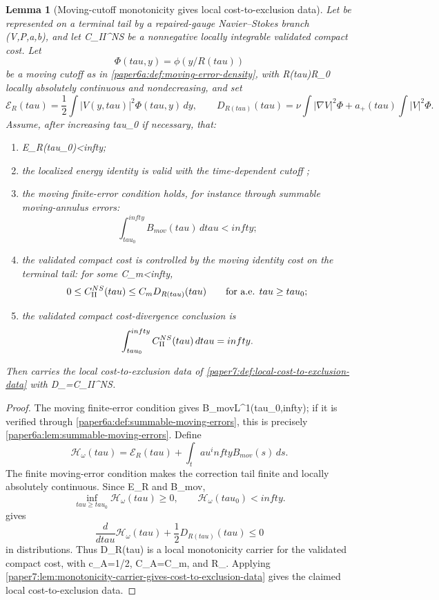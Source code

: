 \documentclass[11pt]{amsart}
\def\({}%
\def\){}%
\def\tilde#1{#1}%
\def\mathfrak#1{#1}%
\def\mathrm#1{#1}%
\def\tau{tau}%
\def\infty{infty}%
\theoremstyle{plain}
\newtheorem{lemma}[lemma]{Lemma}
\theoremstyle{definition}
\theoremstyle{remark}
\begin{document}
\begin{lemma}[Moving-cutoff monotonicity gives local cost-to-exclusion data]
\label{paper7:lem:moving-monotonicity-gives-cost-to-exclusion-data}
Let \(\omega\) be represented on a terminal tail by a repaired-gauge
Navier--Stokes branch \((V,P,a,b)\), and let
\(\mathfrak C_{\rm II}^{NS}\) be a nonnegative locally integrable validated
compact cost.  Let
\[
  \Phi(\tau,y)=\phi(y/R(\tau))
\]
be a moving cutoff as in \cref{paper6a:def:moving-error-density}, with
\(R(\tau)\ge R_0\) locally absolutely continuous and nondecreasing, and set
\[
  \mathcal E_R(\tau)=\frac12\int |V(y,\tau)|^2\Phi(\tau,y)\,dy,
  \qquad
  \tilde{\mathfrak D}_{R(\tau)}(\tau)
  =
  \nu\int|\nabla V|^2\Phi
  +a_+(\tau)\int|V|^2\Phi .
\]
Assume, after increasing \(\tau_0\) if necessary, that:
\begin{enumerate}[label=\textup{(\roman*)}]
\item \(\mathcal E_R(\tau_0)<\infty\);
\item the localized energy identity is valid with the time-dependent cutoff
\(\Phi\);
\item the moving finite-error condition holds, for instance through summable
moving-annulus errors:
\[
  \int_{\tau_0}^{\infty}B_{\mathrm{mov}}(\tau)\,d\tau<\infty;
\]
\item the validated compact cost is controlled by the moving identity cost on
the terminal tail: for some \(C_m<\infty\),
\[
  0\le \mathfrak C_{\rm II}^{NS}(\tau)
  \le C_m\tilde{\mathfrak D}_{R(\tau)}(\tau)
  \qquad\text{for a.e. }\tau\ge\tau_0;
\]
\item the validated compact cost-divergence conclusion is
\[
  \int_{\tau_0}^{\infty}
  \mathfrak C_{\rm II}^{NS}(\tau)\,d\tau=\infty .
\]
\end{enumerate}
Then \(\omega\) carries the local cost-to-exclusion data of
\cref{paper7:def:local-cost-to-exclusion-data} with
\(\mathcal D_\omega=\mathfrak C_{\rm II}^{NS}\).
\end{lemma}

\begin{proof}
The moving finite-error condition gives
\(B_{\mathrm{mov}}\in L^1(\tau_0,\infty)\); if it is verified through
\cref{paper6a:def:summable-moving-errors}, this is precisely
\cref{paper6a:lem:summable-moving-errors}.  Define
\[
  \mathcal H_\omega(\tau)
  =
  \mathcal E_R(\tau)+\int_\tau^\infty B_{\mathrm{mov}}(s)\,ds .
\]
The finite moving-error condition makes the correction tail finite and locally
absolutely continuous.  Since \(\mathcal E_R\) and
\(B_{\mathrm{mov}}\),
\[
  \inf_{\tau\ge\tau_0}\mathcal H_\omega(\tau)\ge0,
  \qquad
  \mathcal H_\omega(\tau_0)<\infty .
\]
 gives
\[
  \frac{d}{d\tau}\mathcal H_\omega(\tau)
  +\frac12\tilde{\mathfrak D}_{R(\tau)}(\tau)\le0
\]
in distributions.  Thus
\(\tilde{\mathfrak D}_{R(\tau)}\) is a local monotonicity carrier for the
validated compact cost, with \(c_A=1/2\), \(C_A=C_m\), and
\(\mathcal R_\).  Applying
\cref{paper7:lem:monotonicity-carrier-gives-cost-to-exclusion-data} gives the
claimed local cost-to-exclusion data.
\end{proof}
\end{document}
